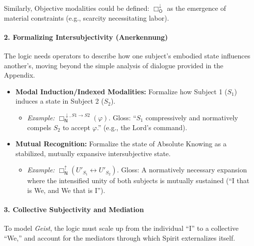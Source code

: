 Similarly, Objective modalities could be defined: \(\Box_{\mathsf{O}}^{\downarrow}\) as the emergence of material constraints (e.g., scarcity necessitating labor).

\paragraph{2. Formalizing Intersubjectivity (Anerkennung)}\label{formalizing-intersubjectivity-anerkennung}

The logic needs operators to describe how one subject's embodied state influences another's, moving beyond the simple analysis of dialogue provided in the Appendix.

\begin{itemize}
\tightlist
\item
  \textbf{Modal Induction/Indexed Modalities:} Formalize how Subject 1 (\(S_1\)) induces a state in Subject 2 (\(S_2\)).

  \begin{itemize}
  \tightlist
  \item
    \emph{Example:} \(\Box_{\mathsf{N}}^{\downarrow, S1 \rightarrow S2}(\varphi)\). Gloss: ``\(S_1\) compressively and normatively compels \(S_2\) to accept \(\varphi\).'' (e.g., the Lord's command).
  \end{itemize}
\item
  \textbf{Mutual Recognition:} Formalize the state of Absolute Knowing as a stabilized, mutually expansive intersubjective state.

  \begin{itemize}
  \tightlist
  \item
    \emph{Example:} \(\Box_{\mathsf{N}}^{\uparrow}(U'_{S_1} \leftrightarrow U'_{S_2})\). Gloss: A normatively necessary expansion where the intensified unity of both subjects is mutually sustained (``I that is We, and We that is I'').
  \end{itemize}
\end{itemize}

\paragraph{3. Collective Subjectivity and Mediation}\label{collective-subjectivity-and-mediation}

To model \emph{Geist}, the logic must scale up from the individual ``I'' to a collective ``We,'' and account for the mediators through which Spirit externalizes itself.

